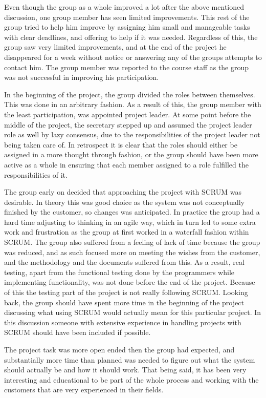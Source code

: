 \documentclass[11pt]{book}
\begin{document}
Even though the group as a whole improved a lot after the above mentioned discussion, one group member has seen limited improvements. This rest of the group tried to help him improve by assigning him small and manageable tasks with clear deadlines, and offering to help if it was needed. Regardless of this, the group saw very limited improvements, and at the end of the project he disappeared for a week without notice or answering any of the groups attempts to contact him. The group member was reported to the course staff as the group was not successful in improving his participation.

In the beginning of the project, the group divided the roles between themselves. This was done in an arbitrary fashion. As a result of this, the group member with the least participation, was appointed project leader. At some point before the middle of the project, the secretary stepped up and assumed the project leader role as well by lazy consensus, due to the responsibilities of the project leader not being taken care of. In retrospect it is clear that the roles should either be assigned in a more thought through fashion, or the group should have been more active as a whole in ensuring that each member assigned to a role fulfilled the responsibilities of it.

The group early on decided that approaching the project with SCRUM was desirable. In theory this was good choice as the system was not conceptually finished by the customer, so changes was anticipated. In practice the group had a hard time adjusting to thinking in an agile way, which in turn led to some extra work and frustration as the group at first worked in a waterfall fashion within SCRUM. The group also suffered from a feeling of lack of time because the group was reduced, and as such focused more on meeting the wishes from the customer, and the methodology and the documents suffered from this. As a result, real testing, apart from the functional testing done by the programmers while implementing functionality, was not done before the end of the project. Because of this the testing part of the project is not really following SCRUM. Looking back, the group should have spent more time in the beginning of the project discussing what using SCRUM would actually mean for this particular project. In this discussion someone with extensive experience in handling projects with SCRUM should have been included if possible.

The project task was more open ended then the group had expected, and substantially more time than planned was needed to figure out what the system should actually be and how it should work. That being said, it has been very interesting and educational to be part of the whole process and working with the customers that are very experienced in their fields.
\end{document}
